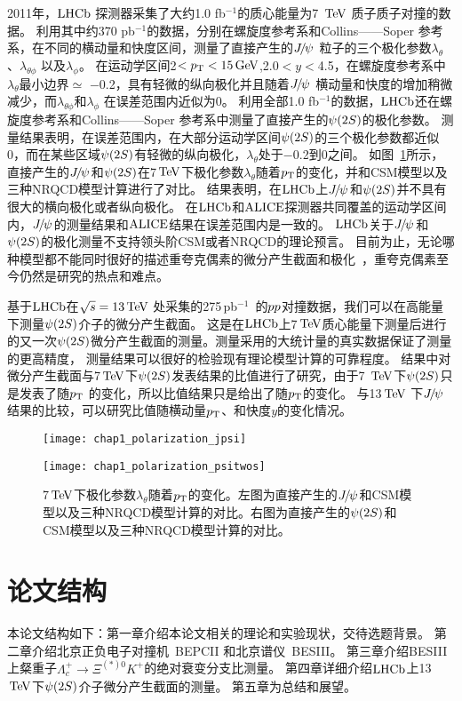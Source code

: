 %
2011年，$\mbox{LHCb}$ 探测器采集了大约1.0 fb$^{-1}$的质心能量为7 $\mathrm{\,Te\kern -0.1em V}$ 质子质子对撞的数据。
利用其中约370 pb$^{-1}$的数据，分别在螺旋度参考系和Collins——Soper 参考系，在不同的横动量和快度区间，测量了直接产生的${{J\mskip -3mu/\mskip -2mu\psi\mskip 2mu}}$ 粒子的三个极化参数$\lambda_{\theta}$、$\lambda_{\theta\phi}$ 以及$\lambda_{\phi}$。
在运动学区间2$<\mbox{$p_{\mathrm{ T}}$}<15\mathrm{\,Ge\kern -0.1em V}$,2.0$<y<$4.5，在螺旋度参考系中$\lambda_{\theta}$最小边界$\simeq$ $-$0.2，具有轻微的纵向极化并且随着${{J\mskip -3mu/\mskip -2mu\psi\mskip 2mu}}$ 横动量和快度的增加稍微减少，而$\lambda_{\theta\phi}$和$\lambda_{\phi}$ 在误差范围内近似为0。
利用全部1.0 fb$^{-1}$的数据，$\mbox{LHCb}$还在螺旋度参考系和Collins——Soper 参考系中测量了直接产生的${\psi{(2S)}}$的极化参数。
测量结果表明，在误差范围内，在大部分运动学区间${\psi{(2S)}}$的三个极化参数都近似0，而在某些区域${\psi{(2S)}}$有轻微的纵向极化，$\lambda_{\theta}$处于$-$0.2到0之间。
如图~\ref{fig:polarization}所示，直接产生的${{J\mskip -3mu/\mskip -2mu\psi\mskip 2mu}}$和${\psi{(2S)}}$在7$\mathrm{\,Te\kern -0.1em V}$下极化参数$\lambda_{\theta}$随着$\mbox{$p_{\mathrm{ T}}$}$的变化，并和CSM模型以及三种NRQCD模型计算进行了对比。
结果表明，在$\mbox{LHCb}$上${{J\mskip -3mu/\mskip -2mu\psi\mskip 2mu}}$和${\psi{(2S)}}$并不具有很大的横向极化或者纵向极化。
在$\mbox{LHCb}$和$\mbox{ALICE}$探测器共同覆盖的运动学区间内，${{J\mskip -3mu/\mskip -2mu\psi\mskip 2mu}}$的测量结果和$\mbox{ALICE}$结果在误差范围内是一致的。
$\mbox{LHCb}$关于${{J\mskip -3mu/\mskip -2mu\psi\mskip 2mu}}$和${\psi{(2S)}}$的极化测量不支持领头阶CSM或者NRQCD的理论预言。
目前为止，无论哪种模型都不能同时很好的描述重夸克偶素的微分产生截面和极化~\cite{Knuenz:2015hga}，重夸克偶素至今仍然是研究的热点和难点。


基于$\mbox{LHCb}$在$\sqrt{s}=13\mathrm{\,Te\kern -0.1em V}$ 处采集的275\,pb$^{-1}$~的${pp}$对撞数据，我们可以在高能量下测量${\psi{(2S)}}$介子的微分产生截面。
这是在$\mbox{LHCb}$上7$\mathrm{\,Te\kern -0.1em V}$质心能量下测量后进行的又一次${\psi{(2S)}}$微分产生截面的测量。测量采用的大统计量的真实数据保证了测量的更高精度，
测量结果可以很好的检验现有理论模型计算的可靠程度。
结果中对微分产生截面与7$\mathrm{\,Te\kern -0.1em V}$下${\psi{(2S)}}$发表结果的比值进行了研究，由于7 $\mathrm{\,Te\kern -0.1em V}$下${\psi{(2S)}}$只是发表了随$\mbox{$p_{\mathrm{ T}}$}$ 的变化，所以比值结果只是给出了随$\mbox{$p_{\mathrm{ T}}$}$的变化。
与13$\mathrm{\,Te\kern -0.1em V}$ 下${{J\mskip -3mu/\mskip -2mu\psi\mskip 2mu}}$结果的比较，可以研究比值随横动量$\mbox{$p_{\mathrm{ T}}$}$、和快度$y$的变化情况。

\begin{figure}[!tbp]
\centering
\begin{minipage}[t]{0.49\textwidth}
\centering
\texttt{[image: chap1\_polarization\_jpsi]}
\end{minipage}
\begin{minipage}[t]{0.49\textwidth}
\centering
\texttt{[image: chap1\_polarization\_psitwos]}
\end{minipage}
\caption{7$\mathrm{\,Te\kern -0.1em V}$下极化参数$\lambda_{\theta}$随着$\mbox{$p_{\mathrm{ T}}$}$的变化。左图为直接产生的${{J\mskip -3mu/\mskip -2mu\psi\mskip 2mu}}$和CSM模型以及三种NRQCD模型计算的对比。右图为直接产生的${\psi{(2S)}}$和CSM模型以及三种NRQCD模型计算的对比。}
\label{fig:polarization}
\end{figure}


\section{论文结构}
	本论文结构如下：第一章介绍本论文相关的理论和实验现状，交待选题背景。
	第二章介绍北京正负电子对撞机~BEPCII 和北京谱仪~BESIII。
	第三章介绍BESIII上粲重子$\Lambda^+_c\to \Xi^{(*)0}K^+$的绝对衰变分支比测量。
	第四章详细介绍$\mbox{LHCb}$上13$\mathrm{\,Te\kern -0.1em V}$下${\psi{(2S)}}$介子微分产生截面的测量。
	第五章为总结和展望。
